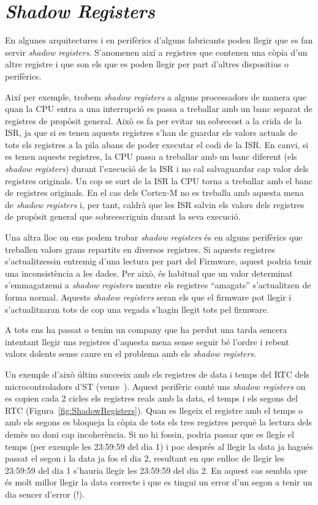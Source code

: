 \chapter{{\em Shadow Registers}}
En algunes arquitectures i en perifèrics d'alguns fabricants poden llegir que es fan servir {\em shadow registers}. S'anomenen així a registres que contenen una còpia d'un altre registre i que son els que es poden llegir per part d'altres dispositius o perifèrics. 

Així per exemple, trobem {\em shadow registers} a alguns processadors de manera que quan la CPU entra a una interrupció es passa a treballar amb un banc separat de registres de propòsit general. Això es fa per evitar un sobrecost a la crida de la ISR, ja que si es tenen aquests registres s'han de guardar els valors actuals de tots els registres a la pila abans de poder executar el codi de la ISR. En canvi, si es tenen aquests registres, la CPU passa a treballar amb un banc diferent (els {\em shadow registers}) durant l'execució de la ISR i no cal salvaguardar cap valor dels registres originals. Un cop se surt de la ISR la CPU torna a treballar amb el banc de registres originals. En el cas dels Cortex-M no es treballa amb aquesta mena de {\em shadow registers} i, per tant, caldrà que les ISR salvin els valors dels registres de propòsit general que sobreescriguin durant la seva execució.

Una altra lloc on ens podem trobar {\em shadow registers} és en alguns perifèrics que treballen valors grans repartits en diversos registres. Si aquests registres s'actualitzessin entremig d'una lectura per part del Firmware, aquest podria tenir una inconsistència a les dades. Per això, és habitual que un valor determinat s'emmagatzemi a {\em shadow registers} mentre els registres ``amagats'' s'actualitzen de forma normal. Aquests {\em shadow registers} seran els que el firmware pot llegir i s'actualitzaran tots de cop una vegada s'hagin llegit tots pel firmware. 

\begin{remark}
 A tots ens ha passat o tenim un company que ha perdut una tarda sencera intentant llegir uns registres d'aquesta mena sense seguir bé l'ordre i rebent valors dolents sense caure en el problema amb els {\em shadow registers}.
\end{remark}

Un exemple d'això últim succeeix amb els registres de data i temps del RTC dels microcontroladors d'ST (veure~). Aquest perifèric conté uns {\em shadow registers} on es copien cada 2 cicles els registres reals amb la data, el temps i els segons del RTC (Figura~\ref{fig:ShadowRegisters}). Quan es llegeix el registre amb el temps o amb els segons es bloqueja la còpia de tots els tres registres perquè la lectura dels demès no doni cap incoherència. Si no hi fossin, podria passar que es llegís el temps (per exemple les 23:59:59 del dia 1) i poc després al llegir la data ja hagués passat el segon i la data ja fos el dia 2, resultant en que enlloc de llegir les 23:59:59 del dia 1 s'hauria llegir les 23:59:59 del dia 2. En aquest cas sembla que és molt millor llegir la data correcte i que es tingui un error d'un segon a tenir un dia sencer d'error (!).

